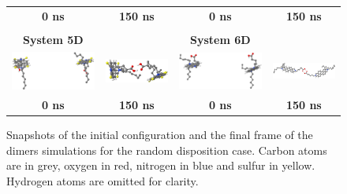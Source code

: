 \begin{figure}[htb]
\begin{tabular}{cccc}
		\small\textbf{0 ns} & \small\textbf{150 ns} & \small\textbf{0 ns} & \small\textbf{150 ns} \\
		&&&\\
		\small\textbf{System 5D} &  & \small\textbf{System 6D} &\\
		\includegraphics[width=0.2\columnwidth]{image/D_M5_0ns} & \includegraphics[width=0.2\columnwidth]{image/D_M5_150ns} &
		\includegraphics[width=0.2\columnwidth]{image/D_M6_0ns} & \includegraphics[width=0.2\columnwidth]{image/D_M6_150ns}\\
		\small\textbf{0 ns} & \small\textbf{150 ns} & \small\textbf{0 ns} & \small\textbf{150 ns} \\
	\end{tabular}
	\caption{Snapshots of the initial configuration and the final frame of the dimers simulations for the random disposition case. Carbon atoms are in grey, oxygen in red, nitrogen in blue and sulfur in yellow. Hydrogen atoms are omitted for clarity.}
	\label{pap:fig04}
\end{figure}

